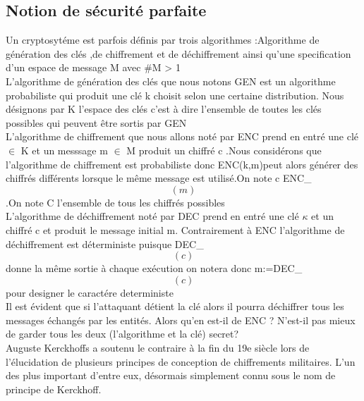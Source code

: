  \subsection{Notion de sécurité parfaite}
 Un cryptosytéme est parfois définis par trois algorithmes :Algorithme de génération des clés ,de chiffrement et de déchiffrement ainsi qu’une specification d’un espace de message M avec \#M > 1
 \\
 L’algorithme de génération des clés que nous notons GEN est un algorithme probabiliste qui produit une clé k choisit  selon une certaine distribution. Nous désignons par  K l’espace des clés c’est à dire l’ensemble de toutes les clés possibles qui peuvent être sortis par GEN
 \\
 L’algorithme de chiffrement que nous allons noté par ENC prend en entré une clé \kappa $ \in $ K et un messsage m $ \in $ M produit un  chiffré c .Nous considérons que l’algorithme de chiffrement est probabiliste donc ENC(k,m)peut alors générer des chiffrés différents lorsque le même message est utilisé.On note c \mapsto ENC{_\kappa}\[ \left (m\right ) \].On note C l’ensemble de tous les chiffrés possibles
\\
L’algorithme de déchiffrement noté par DEC prend en entré une clé $  \kappa $ et un chiffré c et produit le message initial m.
Contrairement à ENC l’algorithme de déchiffrement est déterministe puisque DEC{_\kappa}\[ \left (c \right ) \] donne la même sortie à chaque exécution on notera donc m:=DEC{_\kappa}\[ \left (c \right ) \]  pour designer le caractére deterministe
\\

Il est évident que si l’attaquant détient la clé  alors il pourra déchiffrer tous les messages échangés par les entités. Alors qu’en est-il de ENC ? N’est-il pas mieux de garder tous les deux (l’algorithme et la clé) secret?
\\
Auguste Kerckhoffs  a soutenu le contraire à la fin du 19e siècle lors de l’élucidation de plusieurs principes de conception de chiffrements militaires. L'un des plus important d’entre eux, désormais simplement connu sous le nom de principe de Kerckhoff.
